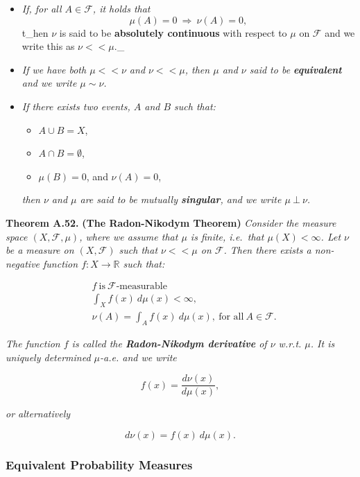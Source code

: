 \documentclass[
]{article}
\providecommand{\tightlist}{%
  \setlength{\itemsep}{0pt}\setlength{\parskip}{0pt}}
\begin{document}
\begin{itemize}
\item
  \emph{If, for all \(A\in \mathcal{F}\), it holds that} \[
    \mu(A)=0\ \Rightarrow\ \nu(A)=0,\tag{A.7}
    \] t\_hen \(\nu\) is said to be \textbf{absolutely continuous} with
  respect to \(\mu\) on \(\mathcal{F}\) and we write this as
  \(\nu < < \mu\).\_
\item
  \emph{If we have both \(\mu << \nu\) and \(\nu << \mu\), then \(\mu\)
  and \(\nu\) said to be \textbf{equivalent} and we write
  \(\mu\sim \nu\).}
\item
  \emph{If there exists two events, \(A\) and \(B\) such that:}

  \begin{itemize}
  \tightlist
  \item
    \(A\cup B=X\),
  \item
    \(A\cap B=\emptyset\),
  \item
    \(\mu(B)=0\), and \(\nu(A)=0\),
  \end{itemize}

  \emph{then \(\nu\) and \(\mu\) are said to be mutually
  \textbf{singular}, and we write \(\mu\ \bot\ \nu\).}
\end{itemize}

\textbf{Theorem A.52.} \textbf{(The Radon-Nikodym Theorem)}
\emph{Consider the measure space \((X,\mathcal{F},\mu)\), where we
assume that \(\mu\) is finite, i.e.~that \(\mu(X)<\infty\). Let \(\nu\)
be a measure on \((X,\mathcal{F})\) such that \(\nu <<\mu\) on
\(\mathcal{F}\). Then there exists a non-negative function
\(f : X\to \mathbb{R}\) such that:}

\begin{align*}
&f\ \text{is}\ \mathcal{F}\text{-measurable}\tag{A.9}\\
&\int_X f(x)\ d\mu(x)<\infty,\tag{A.10}\\
&\nu(A)=\int_Af(x)\ d\mu(x),\ \text{for all}\ A\in \mathcal{F}.\tag{A.11}
\end{align*}

\emph{The function \(f\) is called the \textbf{Radon-Nikodym derivative}
of \(\nu\) w.r.t. \(\mu\). It is uniquely determined \(\mu\)-a.e. and we
write}

\[
f(x)=\frac{d\nu(x)}{d\mu(x)},\tag{A.12}
\]

\emph{or alternatively}

\[
d\nu(x)=f(x)\ d\mu(x).\tag{A.13}
\]

\hypertarget{equivalent-probability-measures-1}{%
\subsubsection{Equivalent Probability
Measures}\label{equivalent-probability-measures-1}}
\end{document}
